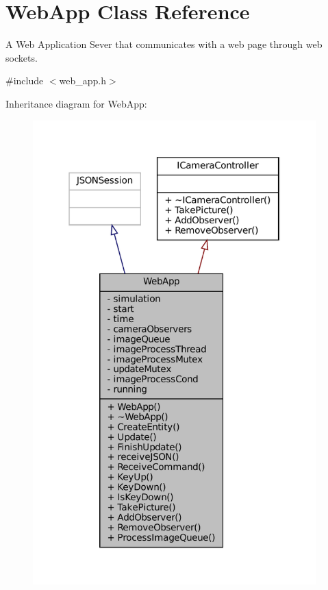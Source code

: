 \hypertarget{classWebApp}{}\section{Web\+App Class Reference}
\label{classWebApp}


A Web Application Sever that communicates with a web page through web sockets.  




{\ttfamily \#include $<$web\+\_\+app.\+h$>$}



Inheritance diagram for Web\+App\+:\nopagebreak
\begin{figure}[H]
\begin{center}
\leavevmode
\includegraphics[width=310pt]{classWebApp__inherit__graph}
\end{center}
\end{figure}


